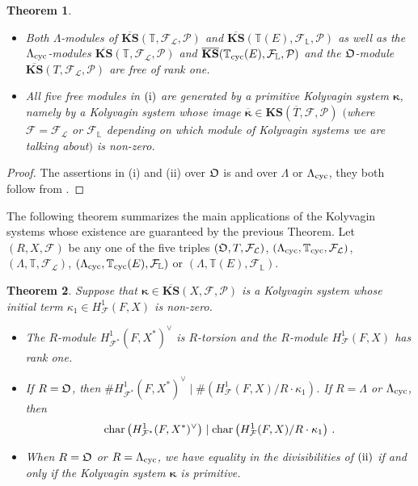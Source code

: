 \documentclass[12pt]{amsart}
\numberwithin{equation}{section}
\newtheorem{thm}{Theorem}[section]
\begin{document}
\begin{thm}
\label{thm:lamdaadicKS}$\,$
\begin{itemize}
\item[(i)] Both ${\Lambda}$-modules of  $\overline{\mathbf{KS}}({\mathbb{T}},{\mathcal{F}}_{\mathcal{L}},{\mathcal{P}})$ and $\overline{\mathbf{KS}}({\mathbb{T}}(E),{\mathcal{F}}_{\mathbb{L}},{\mathcal{P}})$ as well as the ${\Lambda}_{\textup{cyc}}$-modules $\overline{\mathbf{KS}}({\mathbb{T}},{\mathcal{F}}_{\mathcal{L}},{\mathcal{P}})$ and $\overline{\mathbf{KS}}({\mathbb{T}}_{\textup{cyc}}(E),{\mathcal{F}}_{\mathbb{L}},{\mathcal{P}})$ and the ${\frak{O}}$-module $\overline{\mathbf{KS}}(T,{\mathcal{F}}_{\mathcal{L}},{\mathcal{P}})$ are free of rank one.
\item[(ii)] All five free modules in $(\textup{i})$ are generated by a \emph{primitive Kolyvagin system} $\pmb{\kappa}$, namely by a Kolyvagin system whose  image $\overline{\pmb{\kappa}}\in {\mathbf{KS}}(\overline{T},{\mathcal{F}},{\mathcal{P}})$ $($where ${\mathcal{F}}={\mathcal{F}}_{\mathcal{L}}$ or ${\mathcal{F}}_{\mathbb{L}}$ depending on which module of Kolyvagin systems we are talking about$)$ is non-zero.
\end{itemize}
\end{thm}
\begin{proof}
The assertions in (i) and (ii) over ${\frak{O}}$ is \cite[Theorem 5.2.10]{mr02} and over ${\Lambda}$ or ${\Lambda}_{\textup{cyc}}$, they both follow from \cite[Theorem A.14]{kbbCMabvar}.
\end{proof}
The following theorem summarizes the main applications of the Kolyvagin systems whose existence are guaranteed by the previous Theorem. Let $(R,X,{\mathcal{F}})$ be any one of the five triples $({\frak{O}},T,{\mathcal{F}}_{\mathcal{L}})$, $({\Lambda}_{\textup{cyc}},{\mathbb{T}}_{\textup{cyc}},{\mathcal{F}}_{\mathcal{L}})$, $({\Lambda},{\mathbb{T}},{\mathcal{F}}_{\mathcal{L}})$, $({\Lambda}_{\textup{cyc}},{\mathbb{T}}_{\textup{cyc}}(E),{\mathcal{F}}_{\mathbb{L}})$ or $({\Lambda},{\mathbb{T}}(E),{\mathcal{F}}_{\mathbb{L}})$.
\begin{thm}
\label{thm:mainapplicationofrestrictedKS} Suppose that $\pmb{\kappa}\in \overline{\mathbf{KS}}(X,{\mathcal{F}},{\mathcal{P}})$ is a Kolyvagin system whose initial term $\kappa_1 \in H^1_{\mathcal{F}}(F,X)$ is non-zero.
\begin{itemize}
\item[(i)] The $R$-module $H^1_{{\mathcal{F}}^*}(F,X^*)^\vee$ is $R$-torsion and the $R$-module $H^1_{\mathcal{F}}(F,X)$ has rank one.
\item[(ii)] If $R={\frak{O}}$, then $\#H^1_{{\mathcal{F}}^*}(F,X^*)^\vee \mid \#\left(H^1_{\mathcal{F}}(F,X)/R\cdot\kappa_1\right)$. If $R={\Lambda}$ or ${\Lambda}_{\textup{cyc}}$, then 
$$\textup{char}\left(H^1_{{\mathcal{F}}^*}(F,X^*)^\vee\right)\mid \textup{char}\left(H^1_{\mathcal{F}}(F,X)/R\cdot\kappa_1\right)\,.$$
\item[(iii)] When $R={\frak{O}}$ or $R={\Lambda}_{\textup{cyc}}$, we have equality in the divisibilities of $(\textup{ii})$ if and only if the Kolyvagin system $\pmb{\kappa}$ is primitive.
\end{itemize}
\end{thm}
\end{document}
